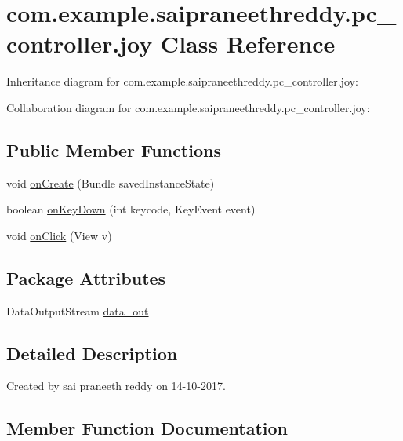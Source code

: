 \hypertarget{classcom_1_1example_1_1saipraneethreddy_1_1pc__controller_1_1joy}{}\section{com.\+example.\+saipraneethreddy.\+pc\+\_\+controller.\+joy Class Reference}
\label{classcom_1_1example_1_1saipraneethreddy_1_1pc__controller_1_1joy}


Inheritance diagram for com.\+example.\+saipraneethreddy.\+pc\+\_\+controller.\+joy\+:


Collaboration diagram for com.\+example.\+saipraneethreddy.\+pc\+\_\+controller.\+joy\+:
\subsection*{Public Member Functions}
\begin{DoxyCompactItemize}
\item 
void \hyperlink{classcom_1_1example_1_1saipraneethreddy_1_1pc__controller_1_1joy_a094e45f42f9ef01824eb1e0149990e7c}{on\+Create} (Bundle saved\+Instance\+State)
\item 
boolean \hyperlink{classcom_1_1example_1_1saipraneethreddy_1_1pc__controller_1_1joy_aa9416a6566c79b34f6aedc7c9f3e1b0e}{on\+Key\+Down} (int keycode, Key\+Event event)
\item 
void \hyperlink{classcom_1_1example_1_1saipraneethreddy_1_1pc__controller_1_1joy_a7f120c072e760037ace1549b964f6f71}{on\+Click} (View v)
\end{DoxyCompactItemize}
\subsection*{Package Attributes}
\begin{DoxyCompactItemize}
\item 
Data\+Output\+Stream \hyperlink{classcom_1_1example_1_1saipraneethreddy_1_1pc__controller_1_1joy_aa15f201983dc6fdfe9883f973ca916dd}{data\+\_\+out}
\end{DoxyCompactItemize}


\subsection{Detailed Description}
Created by sai praneeth reddy on 14-\/10-\/2017. 

\subsection{Member Function Documentation}
